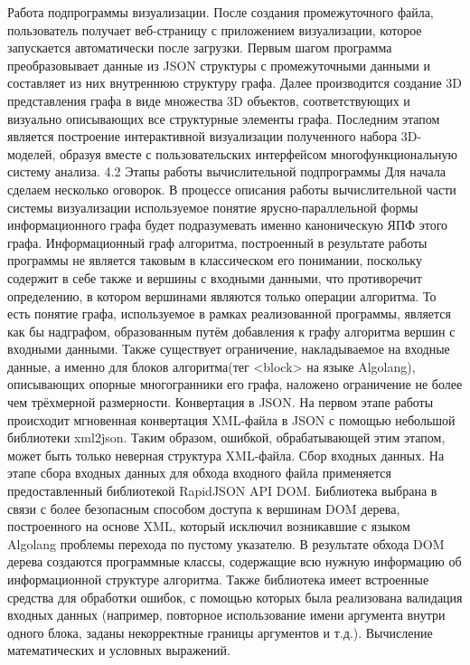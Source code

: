Работа подпрограммы визуализации.
После создания промежуточного файла, пользователь получает веб-страницу с приложением визуализации, которое запускается автоматически после загрузки. Первым шагом программа преобразовывает данные из JSON структуры с промежуточными данными и составляет из них внутреннюю структуру графа. Далее производится создание 3D представления графа в виде множества 3D объектов, соответствующих и визуально описывающих все структурные элементы графа. Последним этапом является построение интерактивной визуализации полученного набора 3D-моделей, образуя вместе с пользовательских интерфейсом многофункциональную систему анализа.
4.2 Этапы работы вычислительной подпрограммы
Для начала сделаем несколько оговорок. В процессе описания работы вычислительной части системы визуализации используемое понятие ярусно-параллельной формы информационного графа будет подразумевать именно каноническую ЯПФ этого графа. Информационный граф алгоритма, построенный в результате работы программы не является таковым в классическом его понимании, поскольку содержит в себе также и вершины с входными данными, что противоречит определению, в котором вершинами являются только операции алгоритма. То есть понятие графа, используемое в рамках реализованной программы, является как бы надграфом, образованным путём добавления к графу алгоритма вершин с входными данными. Также существует ограничение, накладываемое на входные данные, а именно для блоков алгоритма(тег <block> на языке Algolang), описывающих опорные многогранники его графа, наложено ограничение не более чем трёхмерной размерности.
Конвертация в JSON.
На первом этапе работы происходит мгновенная конвертация XML-файла в JSON с помощью небольшой библиотеки xml2json. Таким образом, ошибкой, обрабатывающей этим этапом, может быть только неверная структура XML-файла.
Сбор входных данных.
На этапе сбора входных данных для обхода входного файла применяется предоставленный библиотекой RapidJSON API DOM. Библиотека выбрана в связи с более безопасным способом доступа к вершинам DOM дерева, построенного на основе XML, который исключил возникавшие с языком Algolang проблемы перехода по пустому указателю. В результате обхода DOM дерева создаются программные классы, содержащие всю нужную информацию об информационной структуре алгоритма. Также библиотека имеет встроенные средства для обработки ошибок, с помощью которых была реализована валидация входных данных (например, повторное использование имени аргумента внутри одного блока, заданы некорректные границы аргументов и т.д.).
Вычисление математических и условных выражений.
